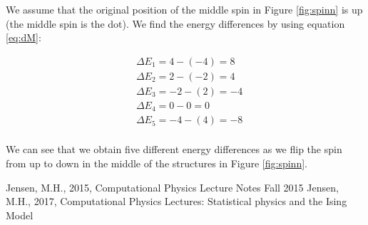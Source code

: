 \documentclass{article}
\begin{document}
We assume that the original position of the middle spin in Figure \ref{fig:spinn} is up (the middle spin is the dot). We find the energy differences by using equation \ref{eq:dM}:

\begin{equation}\label{eq:calc_dE}
\begin{split}
&\Delta E_1 = 4-(-4)=8\\
&\Delta E_2 = 2-(-2)=4\\
&\Delta E_3 = -2-(2)=-4\\
&\Delta E_4 = 0-0=0\\
&\Delta E_5 = -4-(4)=-8\\
\end{split}
\end{equation}

We can see that we obtain five different energy differences as we flip the spin from up to down in the middle of the structures in Figure \ref{fig:spinn}.

\begin{thebibliography}{9}
	Jensen, M.H., 2015, Computational Physics Lecture Notes Fall 2015
	Jensen, M.H., 2017, Computational Physics Lectures: Statistical physics and the Ising Model
\end{thebibliography}
\end{document}
